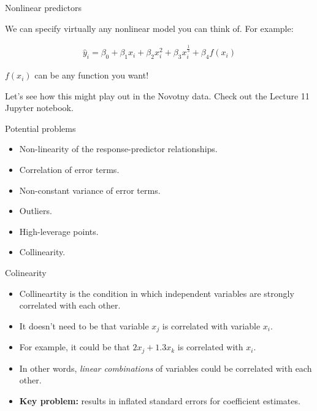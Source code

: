 \documentclass[aspectratio=169]{beamer}
\begin{document}
\begin{frame}{Nonlinear predictors}

We can specify virtually any nonlinear model you can think of. For example:

\begin{align*}
\hat{y}_i = \beta_0 + \beta_1 x_i + \beta_2 x_i^2 + \beta_3 x_i^{\frac{1}{3}} + \beta_4 f(x_i)
\end{align*}

$f(x_i)$ can be any function you want!

\vspace{5mm}
Let's see how this might play out in the Novotny data. Check out the Lecture 11 Jupyter notebook.

\end{frame}

\begin{frame}{Potential problems}
  \begin{itemize}
    \item Non-linearity of the response-predictor relationships. 
    \item Correlation of error terms.
    \item Non-constant variance of error terms.
    \item Outliers.
    \item High-leverage points.
    \item Collinearity.  
  \end{itemize}
\end{frame}

\begin{frame}{Colinearity}

\begin{itemize}
\item Collineartity is the condition in which independent variables are strongly correlated with each other.  
\item It doesn't need to be that variable $x_j$ is correlated with variable $x_i$.  
\item For example, it could be that $2x_j+1.3x_k$ is correlated with $x_i$.
\item In other words, \textit{linear combinations} of variables could be correlated with each other.
\item \textbf{ Key problem: } results in inflated standard errors for coefficient estimates.  

\end{itemize}
\end{frame}
\end{document}
